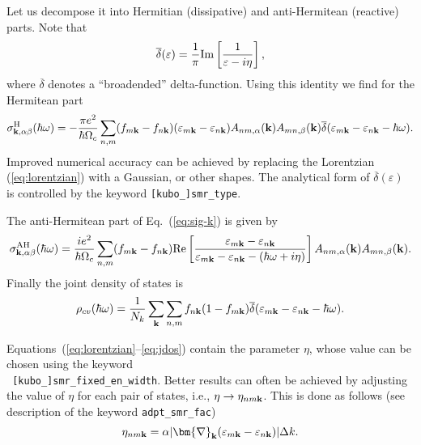Let us decompose it into Hermitian (dissipative) and anti-Hermitean
(reactive) parts. Note that
%
\begin{equation}
\label{eq:lorentzian}
\overline{\delta}(\varepsilon)=\frac{1}{\pi}{\rm Im}
\left[\frac{1}{\varepsilon-i\eta}\right],
\end{equation}
%
where $\overline{\delta}$ denotes a ``broadended''
delta-function. Using this identity we find for the Hermitean part
%
\begin{equation}
\label{eq:sig-H}
\sigma_{{\bf k},\alpha\beta}^{\rm H}(\hbar\omega)=-\frac{\pi e^2}{\hbar\Omega_c}
\sum_{n,m}(f_{m{\bf k}}-f_{n{\bf k}})
(\varepsilon_{m{\bf k}}-\varepsilon_{n{\bf k}})
A_{nm,\alpha}({\bf k})A_{mn,\beta}({\bf k})
\overline{\delta}(\varepsilon_{m{\bf k}}-\varepsilon_{n{\bf k}}-\hbar\omega).
\end{equation}
%
Improved numerical accuracy can be achieved by replacing the
Lorentzian (\ref{eq:lorentzian}) with a Gaussian, or other shapes. The
analytical form of $\overline{\delta}(\varepsilon)$ is controlled by
the keyword {\tt [kubo\_]smr\_type}.

The anti-Hermitean part of Eq.~(\ref{eq:sig-k}) is given by
%
\begin{equation}
\label{eq:sig-AH}
\sigma_{{\bf k},\alpha\beta}^{\rm AH}(\hbar\omega)=\frac{ie^2}{\hbar\Omega_c}
\sum_{n,m}(f_{m{\bf k}}-f_{n{\bf k}})
{\rm Re}\left[ \frac{\varepsilon_{m{\bf k}}-\varepsilon_{n{\bf k}}}
                    {\varepsilon_{m{\bf k}}-\varepsilon_{n{\bf k}}
                     -(\hbar\omega+i\eta)}
\right]
A_{nm,\alpha}({\bf k})A_{mn,\beta}({\bf k}).
\end{equation}
%
Finally the joint density of states is
%
\begin{equation}
\label{eq:jdos}
\rho_{cv}(\hbar\omega)=\frac{1}{N_k}\sum_{\bf k}\sum_{n,m}
f_{n{\bf k}}(1-f_{m{\bf k}})
\overline{\delta}(\varepsilon_{m{\bf k}}-\varepsilon_{n{\bf k}}-\hbar\omega).
\end{equation}

Equations~(\ref{eq:lorentzian}--\ref{eq:jdos}) contain the parameter
$\eta$, whose value can be chosen using the keyword\\ {\tt
  [kubo\_]smr\_fixed\_en\_width}. Better results can often be achieved
by adjusting the value of $\eta$ for each pair of states, i.e.,
$\eta\rightarrow \eta_{nm\bf k}$. This is done as follows (see
description of the keyword {\tt adpt\_smr\_fac})
%
\begin{equation}
\eta_{nm{\bf k}}=\alpha\vert \bm{\nabla}_{\bf k}
(\varepsilon_{m{\bf k}}-\varepsilon_{n{\bf k}})\vert \Delta k.
\end{equation}

